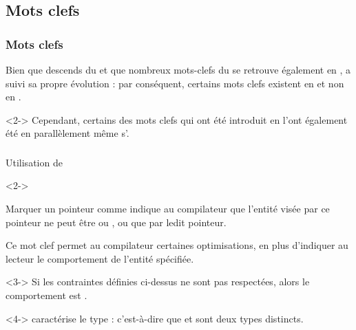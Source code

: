 \documentclass{cppcourses}
\begin{document}
\subsection{Mots clefs}

\begin{frame}

\frametitle{Mots clefs}

Bien que  descends du  et que nombreux mots-clefs du  se retrouve également en ,  a suivi sa propre évolution : par conséquent, certains mots clefs existent en  et non en .

\begin{remark}<2->
Cependant, certains des mots clefs qui ont été introduit en  l'ont également été en  parallèlement même s'.
\end{remark}

\end{frame}

\subsubsection{}

\begin{frame}

\frametitle{}

\begin{myfigure}
\caption{Utilisation de }
\end{myfigure}

\begin{uncoverenv}<2->

Marquer un pointeur comme  indique au compilateur que l'entité visée par ce pointeur ne peut être  ou ,  ou  que par ledit pointeur.

Ce mot clef permet au compilateur certaines optimisations, en plus d'indiquer au lecteur le comportement de l'entité spécifiée.

\end{uncoverenv}

\begin{warning}<3->
Si les contraintes définies ci-dessus ne sont pas respectées, alors le comportement est .
\end{warning}

\begin{remark}<4->
 caractérise le type : c'est-à-dire que  et \mykeyword{\textcolor{blue}{type}*} sont deux types distincts.
\end{remark}

\end{frame}
\end{document}
